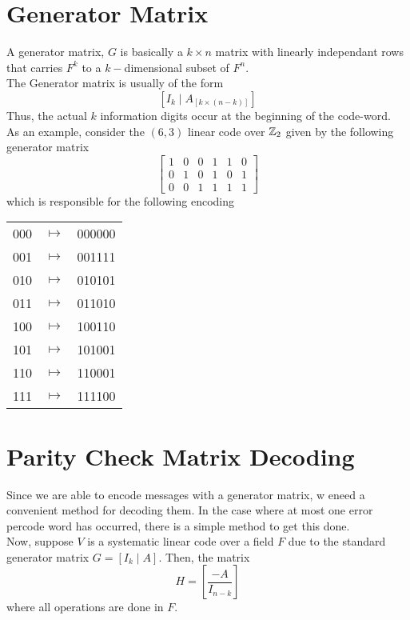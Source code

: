 \section*{Generator Matrix}
A generator matrix, $G$ is basically a $k\times n$ matrix with linearly independant rows that carries $F^k$ to a $k-$dimensional subset of $F^n$.\\
The Generator matrix is usually of the form
\begin{equation*}
	\left[I_k\mid A_{[k\times(n-k)]}\right]
\end{equation*}
Thus, the actual $k$ information digits occur at the beginning of the code-word.\\
As an example, consider the $(6,3)$ linear code over $\mathbb{Z}_2$ given by the following generator matrix
\begin{equation*}
	\begin{bmatrix}
		1 & 0 & 0 & 1 & 1 & 0\\
		0 & 1 & 0 & 1 & 0 & 1\\
		0 & 0 & 1 & 1 & 1 & 1
	\end{bmatrix}
\end{equation*}
which is responsible for the following encoding \\
\begin{center}
	\begin{tabular}{ccc}
		000 & $\mapsto$ & 000000\\
		001 & $\mapsto$ & 001111\\
		010 & $\mapsto$ & 010101\\
		011 & $\mapsto$ & 011010\\
		100 & $\mapsto$ & 100110\\
		101 & $\mapsto$ & 101001\\
		110 & $\mapsto$ & 110001\\
		111 & $\mapsto$ & 111100
	\end{tabular}
\end{center}

\section*{Parity Check Matrix Decoding}
Since we are able to encode messages with a generator matrix, w eneed a convenient method for decoding them. In the case where at most one error percode word has occurred, there is a simple method to get this done.\\
Now, suppose $V$ is a systematic linear code over a field $F$ due to the standard generator matrix $G=\left[I_k\mid A\right]$. Then, the matrix 
\begin{equation*}
	H = \left[\frac{-A}{I_{n-k}}\right]
\end{equation*}
where all operations are done in $F$.

